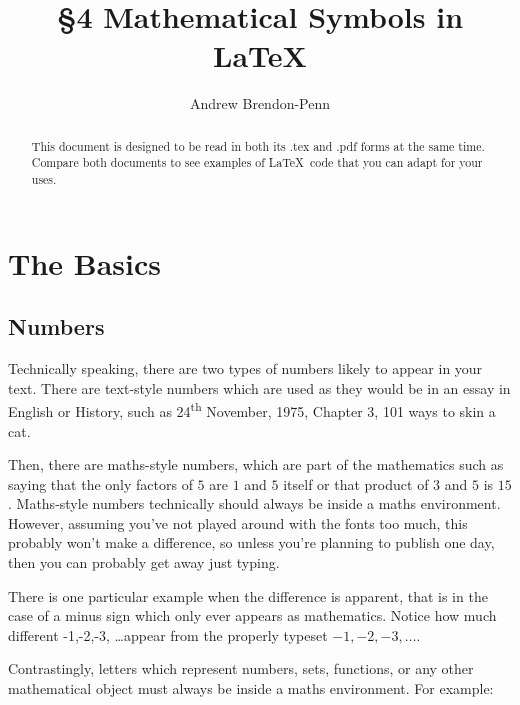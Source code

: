\documentclass[a4paper,11pt]{article}
\title{\S4 Mathematical Symbols in \LaTeX}
\author{Andrew Brendon-Penn}
\begin{document}

\maketitle  %

\begin{abstract}
This document is designed to be read in both its .tex and .pdf forms at the same time. Compare both documents to see examples of \LaTeX \, code that you can adapt for your uses.
\end{abstract}

\tableofcontents %
\pagebreak

\section{The Basics}

\subsection{Numbers}

Technically speaking, there are two types of numbers likely to appear in your text. There are text-style numbers which are used as they would be in an essay in English or History, such as 24\textsuperscript{th} November, 1975, Chapter 3, 101 ways to skin a cat.

Then, there are maths-style numbers, which are part of the mathematics such as saying that the only factors of $5$ are $1$ and $5$ itself or that product of $3$ and $5$ is $15$. Maths-style numbers technically should always be inside a maths environment. However, assuming you've not played around with the fonts too much, this probably won't make a difference, so unless you're planning to publish one day, then you can probably get away just typing.

There is one particular example when the difference is apparent, that is in the case of a minus sign which only ever appears as mathematics. Notice how much different -1,-2,-3, \ldots appear from the properly typeset $-1,-2,-3, \ldots$.

Contrastingly, letters which represent numbers, sets, functions, or any other mathematical object must always be inside a maths environment. For example: 
\end{document}
